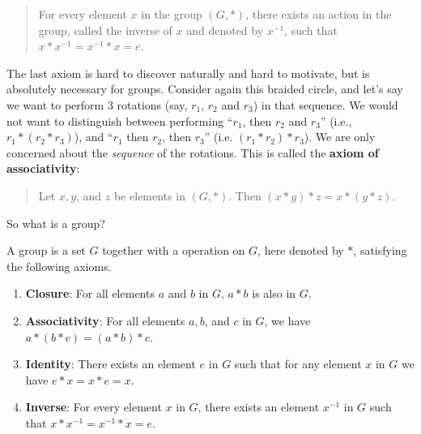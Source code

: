 \newpage

\begin{quote}
    For every element $x$ in the group $(G, \ast)$, there exists an action in the group, called the inverse of $x$ and denoted by $x^{-1}$, such that $x \ast x^{-1} = x^{-1} \ast x = e$.
\end{quote}

\begin{figure}
    \centering
\end{figure}

The last axiom is hard to discover naturally and hard to motivate, but is absolutely necessary for groups. Consider again this braided circle, and let's say we want to perform 3 rotations (say, $r_1$, $r_2$ and $r_3$) in that sequence. We would not want to distinguish between performing ``$r_1$, then $r_2$ and $r_3$'' (i.e., $r_1 \ast (r_2 \ast r_3)$), and ``$r_1$ then $r_2$, then $r_3$'' (i.e. $(r_1 \ast r_2) \ast r_3$). We are only concerned about the \textit{sequence} of the rotations. This is called the \textbf{axiom of associativity}:
\begin{quote}
    Let $x, y$, and $z$ be elements in $(G, \ast)$. Then $(x \ast y) \ast z = x \ast (y \ast z)$.
\end{quote}

So what is a group?
\begin{definition}
    A group is a set $G$ together with a operation on $G$, here denoted by $\ast$, satisfying the following axioms.
    \begin{enumerate}
        \item \textbf{Closure}: For all elements $a$ and $b$ in $G$, $a \ast b$ is also in $G$.
        \item \textbf{Associativity}: For all elements $a, b$, and $c$ in $G$, we have $a \ast (b \ast c) = (a \ast b) \ast c$.
        \item \textbf{Identity}: There exists an element $e$ in $G$ such that for any element $x$ in $G$ we have $e \ast x = x \ast e = x$.
        \item \textbf{Inverse}: For every element $x$ in $G$, there exists an element $x^{-1}$ in $G$ such that $x \ast x^{-1} = x^{-1} \ast x = e$.
    \end{enumerate}
\end{definition}

